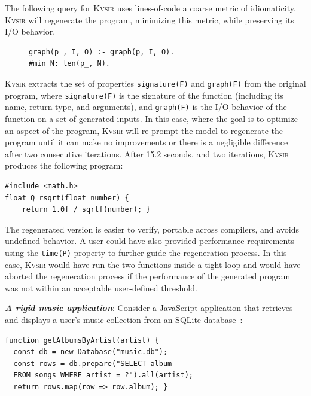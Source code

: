 \documentclass[nonacm,sigplan,review]{acmart}
\newcommand{\sys}{{\scshape Kv{\textalpha}sir}\xspace}
\newcommand{\heading}[1]{\vspace{2pt}\noindent\textbf{\emph{#1}}:\enspace}
\newcommand{\ttt}[1]{\texttt{#1}\xspace}
\begin{document}
The following query for \sys uses lines-of-code a coarse metric of
idiomaticity. \sys will regenerate the program, minimizing this metric, while
preserving its I/O behavior.
\begin{figure}
  \vspace{-5pt}
  \begin{verbatim}
graph(p_, I, O) :- graph(p, I, O).
#min N: len(p_, N).
  \end{verbatim}
\end{figure}
\sys extracts the set of properties \ttt{signature(F)} and \ttt{graph(F)} from
the original program, where \texttt{signature(F)} is the
signature of the function (including its name, return type, and arguments), and \texttt{graph(F)} is the I/O behavior of the function
on a set of generated inputs.
In this case, where the goal is to optimize an aspect of the program, \sys will re-prompt
the model to regenerate the program until it can make no improvements or there is a negligible difference after two consecutive iterations.
After 15.2 seconds, and two iterations, \sys produces the following program:
\begin{verbatim}
#include <math.h>
float Q_rsqrt(float number) {
    return 1.0f / sqrtf(number); }
\end{verbatim}
The regenerated version is easier to verify, portable across compilers, and
avoids undefined behavior.
A user could have also provided performance requirements using 
the \ttt{time(P)} property to further guide the regeneration process.
In this case, \sys would have run the two functions inside a tight loop and 
would have aborted the regeneration process if the performance of the generated
program was not within an acceptable user-defined threshold.

\heading{A rigid music application}
Consider a JavaScript application that retrieves and displays a user's music
collection from an SQLite database~\cite{codewithsadeemusicplayer, beets}:

\begin{verbatim}
function getAlbumsByArtist(artist) {
  const db = new Database("music.db");
  const rows = db.prepare("SELECT album
  FROM songs WHERE artist = ?").all(artist);
  return rows.map(row => row.album); }
\end{verbatim}
\end{document}
